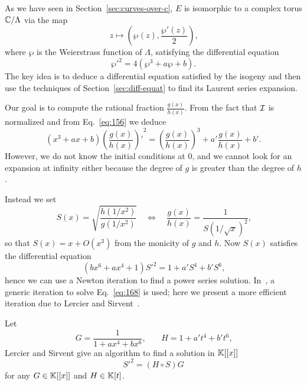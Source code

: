 As we have seen in Section~\ref{sec:curves-over-c}, $E$ is isomorphic
to a complex torus $\mathbb{C}/\Lambda$ via the map
\begin{equation}
  \label{eq:154}
  z \mapsto \left(\wp(z), \frac{\wp'(z)}{2}\right)
  \text{,}
\end{equation}
where $\wp$ is the Weierstrass function of $\Lambda$, satisfying the
differential equation
\begin{equation}
  \label{eq:156}
  {\wp'}^2 = 4(\wp^3 + a\wp + b)
  \text{.}
\end{equation}
The key idea is to deduce a differential equation satisfied by the
isogeny and then use the techniques of Section~\ref{sec:diff-equat} to
find its Laurent series expansion.

Our goal is to compute the rational fraction $\frac{g(x)}{h(x)}$. From
the fact that $\mathcal{I}$ is normalized and from Eq.~\eqref{eq:156} we deduce
\begin{equation}
  \label{eq:166}
  (x^3 + ax + b){\left(\frac{g(x)}{h(x)}\right)'}^2 =
  \left(\frac{g(x)}{h(x)}\right)^3 + a'\frac{g(x)}{h(x)} + b'
  \text{.}
\end{equation}
However, we do not know the initial conditions at $0$, and we cannot
look for an expansion at infinity either because the degree of $g$ is
greater than the degree of $h$.

Instead we set
\begin{equation}
  \label{eq:167}
  S(x) = \sqrt{\frac{h(1/x^2)}{g(1/x^2)}}
  \quad\Leftrightarrow\quad
  \frac{g(x)}{h(x)} = \frac{1}{S(1/\sqrt{x})^2}
  \text{,}
\end{equation}
so that $S(x) = x + O(x^3)$ from the monicity of $g$ and $h$. Now
$S(x)$ satisfies the differential equation
\begin{equation}
  \label{eq:168}
  (bx^6 + ax^4 + 1){S'}^2 = 1 + a'S^4 + b'S^6
  \text{,}
\end{equation}
hence we can use a Newton iteration to find a power series
solution. In~\cite[2.4]{bostan+morain+salvy+schost08}, a generic
iteration to solve Eq.~\eqref{eq:168} is used; here we present a more
efficient iteration due to Lercier and
Sirvent~\cite{lercier+sirvent08}.

Let 
\begin{equation}
  \label{eq:169}
  G = \frac{1}{1 + ax^4 + bx^6}
  \text{,}\qquad
  H = 1 + a't^4 + b't^6
  \text{,}
\end{equation}
Lercier and Sirvent give an algorithm to find a solution in $\mathbb{K}[[x]]$
\begin{equation}
  \label{eq:170}
  {S'}^2 = (H\circ S)G
\end{equation}
for any $G\in\mathbb{K}[[x]]$ and $H\in\mathbb{K}[t]$.


